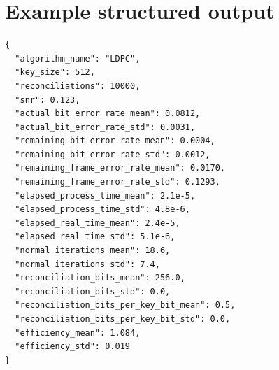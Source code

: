 \documentclass{UoYCSproject}
\begin{document}
\clearpage
\section{Example structured output}

\begin{lstlisting}[style=appendixcode,language={},caption={Illustrative NDJSON-style summary record for one LDPC operating point.},label={lst:ndjson-example}]
{
  "algorithm_name": "LDPC",
  "key_size": 512,
  "reconciliations": 10000,
  "snr": 0.123,
  "actual_bit_error_rate_mean": 0.0812,
  "actual_bit_error_rate_std": 0.0031,
  "remaining_bit_error_rate_mean": 0.0004,
  "remaining_bit_error_rate_std": 0.0012,
  "remaining_frame_error_rate_mean": 0.0170,
  "remaining_frame_error_rate_std": 0.1293,
  "elapsed_process_time_mean": 2.1e-5,
  "elapsed_process_time_std": 4.8e-6,
  "elapsed_real_time_mean": 2.4e-5,
  "elapsed_real_time_std": 5.1e-6,
  "normal_iterations_mean": 18.6,
  "normal_iterations_std": 7.4,
  "reconciliation_bits_mean": 256.0,
  "reconciliation_bits_std": 0.0,
  "reconciliation_bits_per_key_bit_mean": 0.5,
  "reconciliation_bits_per_key_bit_std": 0.0,
  "efficiency_mean": 1.084,
  "efficiency_std": 0.019
}
\end{lstlisting}

\printbibliography
\end{document}
